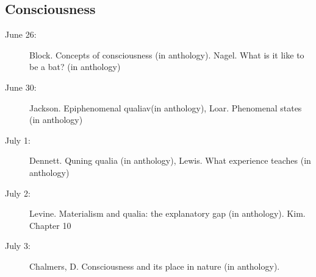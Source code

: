 \documentclass[11pt]{article}
\begin{document}
\subsection{Consciousness}
\begin{description}
\item [June 26:] Block. Concepts of consciousness (in anthology). Nagel. What is it like to be a bat? (in anthology)
\item [June 30:] Jackson. Epiphenomenal qualiav(in anthology), Loar. Phenomenal states (in anthology)
\item [July 1:] Dennett. Quning qualia (in anthology), Lewis. What experience teaches (in anthology)
\item [July 2:] Levine. Materialism and qualia: the explanatory gap (in anthology). Kim. Chapter 10
\item [July 3:] Chalmers, D. Consciousness and its place in nature (in anthology).
\end{description}
\end{document}
